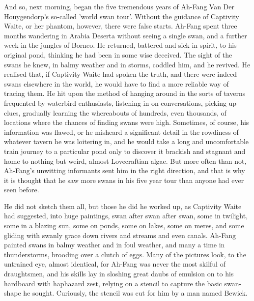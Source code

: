 And so, next morning, began the five tremendous years of Ah-Fang Van Der Houygendorp's so-called 'world swan tour'. Without the guidance of Captivity Waite, or her phantom, however, there were false starts. Ah-Fang spent three months wandering in Arabia Deserta without seeing a single swan, and a further week in the jungles of Borneo. He returned, battered and sick in spirit, to his original pond, thinking he had been in some wise deceived. The sight of the swans he knew, in balmy weather and in storms, coddled him, and he revived. He realised that, if Captivity Waite had spoken the truth, and there were indeed swans elsewhere in the world, he would have to find a more reliable way of tracing them. He hit upon the method of hanging around in the sorts of taverns frequented by waterbird enthusiasts, listening in on conversations, picking up clues, gradually learning the whereabouts of hundreds, even thousands, of locations where the chances of finding swans were high. Sometimes, of course, his information was flawed, or he misheard a significant detail in the rowdiness of whatever tavern he was loitering in, and he would take a long and uncomfortable train journey to a particular pond only to discover it brackish and stagnant and home to nothing but weird, almost Lovecraftian algae. But more often than not, Ah-Fang's unwitting informants sent him in the right direction, and that is why it is thought that he saw more swans in his five year tour than anyone had ever seen before.

He did not sketch them all, but those he did he worked up, as Captivity Waite had suggested, into huge paintings, swan after swan after swan, some in twilight, some in a blazing sun, some on ponds, some on lakes, some on meres, and some gliding with swanly grace down rivers and streams and even canals. Ah-Fang painted swans in balmy weather and in foul weather, and many a time in thunderstorms, brooding over a clutch of eggs. Many of the pictures look, to the untrained eye, almost identical, for Ah-Fang was never the most skilful of draughtsmen, and his skills lay in sloshing great daubs of emulsion on to his hardboard with haphazard zest, relying on a stencil to capture the basic swan-shape he sought. Curiously, the stencil was cut for him by a man named Bewick.

